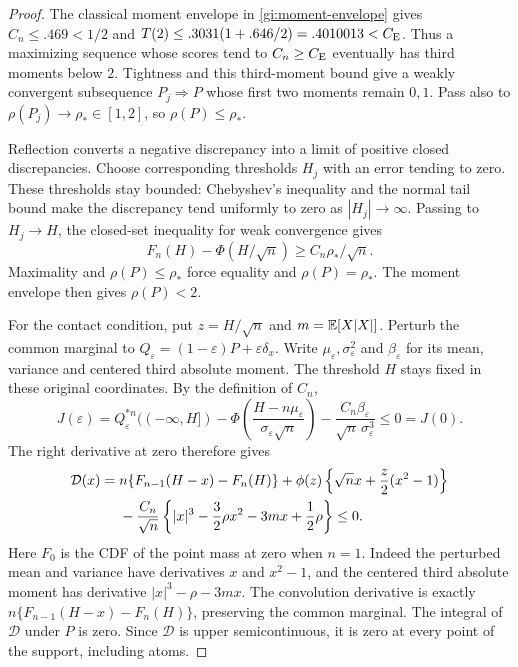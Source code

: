\begin{proof}
The classical moment envelope in \eqref{gi:moment-envelope} gives
$C_n\le.469<1/2$ and
$T(2)\le.3031(1+.646/2)=.4010013<C_{\mathrm E}$.
Thus a maximizing sequence whose scores tend to $C_n\ge C_{\mathrm E}$
eventually has third moments below $2$. Tightness and this third-moment
bound give a weakly convergent subsequence $P_j\Rightarrow P$ whose
first two moments remain $0,1$. Pass also to
$\rho(P_j)\to\rho_*\in[1,2]$, so $\rho(P)\le\rho_*$.

Reflection converts a negative discrepancy into a limit of positive
closed discrepancies. Choose corresponding thresholds $H_j$ with
an error tending to zero. These thresholds stay bounded: Chebyshev's
inequality and the normal tail bound make the discrepancy tend uniformly
to zero as $|H_j|\to\infty$. Passing to $H_j\to H$, the closed-set
inequality for weak convergence gives
\[
 F_n(H)-\Phi(H/\sqrt n)\ge C_n\rho_*/\sqrt n.
\]
Maximality and $\rho(P)\le\rho_*$ force equality and
$\rho(P)=\rho_*$. The moment envelope then gives $\rho(P)<2$.

For the contact condition, put $z=H/\sqrt n$ and $m=\mathbb E[X|X|]$.
Perturb the common marginal to
$Q_\varepsilon=(1-\varepsilon)P+\varepsilon\delta_x$.
Write $\mu_\varepsilon,\sigma_\varepsilon^2$ and
$\beta_\varepsilon$ for its mean, variance and centered third
absolute moment. The threshold $H$ stays fixed in these original
coordinates. By the definition of $C_n$,
\[
 J(\varepsilon)=Q_\varepsilon^{*n}(( -\infty,H])
 -\Phi\left(\frac{H-n\mu_\varepsilon}{\sigma_\varepsilon\sqrt n}\right)
 -\frac{C_n\beta_\varepsilon}{\sqrt n\,\sigma_\varepsilon^3}
 \le0=J(0).
\]
The right derivative at zero therefore gives
\begin{align}\label{gi:contact}
 \mathcal D(x)={}&n\{F_{n-1}(H-x)-F_n(H)\}
 +\phi(z)\left\{\sqrt n x+\frac z2(x^2-1)\right\}\notag\\
 &-\frac{C_n}{\sqrt n}
 \left\{|x|^3-\frac32\rho x^2-3mx+\frac12\rho\right\}\le0.
\end{align}
Here $F_0$ is the CDF of the point mass at zero when $n=1$.
Indeed the perturbed mean and variance have derivatives $x$ and
$x^2-1$, and the centered third absolute moment has derivative
$|x|^3-\rho-3mx$. The convolution derivative is exactly
$n\{F_{n-1}(H-x)-F_n(H)\}$, preserving the common marginal.
The integral of $\mathcal D$ under $P$ is zero.
Since $\mathcal D$ is upper semicontinuous, it is zero at every
point of the support, including atoms.

\end{proof}

